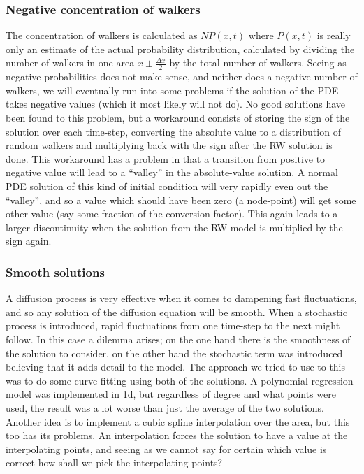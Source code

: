 \subsubsection{Negative concentration of walkers}
 The concentration of walkers is calculated as $NP(x,t)$ where $P(x,t)$ is really only an estimate of the actual probability distribution, calculated by dividing the number of walkers in one area $x\pm\frac{\Delta x}{2}$ by the total number of walkers. 
 Seeing as negative probabilities does not make sense, and neither does a negative number of walkers, we will eventually run into some problems if the solution of the PDE takes negative values (which it most likely will not do). 
 No good solutions have been found to this problem, but a workaround consists of storing the sign of the solution over each time-step, converting the absolute value to a distribution of random walkers and multiplying back with the sign after the RW solution is done. 
 This workaround has a problem in that a transition from positive to negative value will lead to a ``valley'' in the absolute-value solution. 
 A normal PDE solution of this kind of initial condition will very rapidly even out the ``valley'', and so a value which should have been zero (a node-point) will get some other value (say some fraction of the conversion factor). This again leads to a larger discontinuity when the solution from the RW model is multiplied by the sign again.

\subsubsection{Smooth solutions}
 A diffusion process is very effective when it comes to dampening fast fluctuations, and so any solution of the diffusion equation will be smooth. 
 When a stochastic process is introduced, rapid fluctuations from one time-step to the next might follow.
 In this case a dilemma arises; on the one hand there is the smoothness of the solution to consider, on the other hand the stochastic term was introduced believing that it adds detail to the model. 
 The approach we tried to use to this was to do some curve-fitting using both of the solutions. 
 A polynomial regression model was implemented in 1d, but regardless of degree and what points were used, the result was a lot worse than just the average of the two solutions. 
 Another idea is to implement a cubic spline interpolation over the area, but this too has its problems. An interpolation forces the solution to have a value at the interpolating points, and seeing as we cannot say for certain which value is correct how shall we pick the interpolating points?

